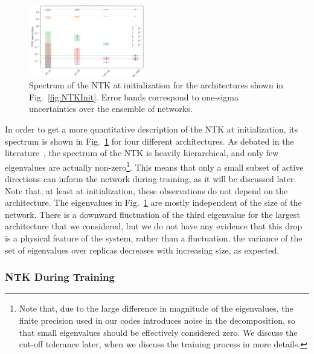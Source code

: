 \begin{figure}[t]
  \centering
  \includegraphics[width=0.45\textwidth]{figs/section_3/ntk_initialization_arch.pdf}
  \caption{Spectrum of the NTK at initialization for the architectures shown in
  Fig.~\ref{fig:NTKInit}. Error bands correspond to one-sigma uncertainties over
  the ensemble of networks.}
  \label{fig:NTKSpectrum}
\end{figure}

In order to get a more quantitative description of the NTK at initialization,
its spectrum is shown in Fig.~\ref{fig:NTKSpectrum} for four different
architectures. As debated in the literature~\cite{XXX}, the spectrum of the NTK
is heavily hierarchical, and only few eigenvalues are actually
non-zero\footnote{Note that, due to the large difference in magnitude of the
eigenvalues, the finite precision used in our codes introduces noise in the
decomposition, so that small eigenvalues should be effectively considered zero.
We discuss the cut-off tolerance later, when we discuss the training process in
more details.}. This means that only a small subset of active directions can
inform the network during training, as it will be discussed later. Note that, at
least at initialization, these observations do not depend on the architecture.
The eigenvalues in Fig.~\ref{fig:NTKSpectrum} are mostly independent of the size
of the network. There is a downward fluctuation of the third eigenvalue for the
largest architecture that we considered, but we do not have any evidence that
this drop is a physical feature of the system, rather than a fluctuation. the
variance of the set of eigenvalues over replicas decreases with increasing size,
as expected. 


\subsubsection{NTK During Training}
\label{sec:NTKDuringTraining}


